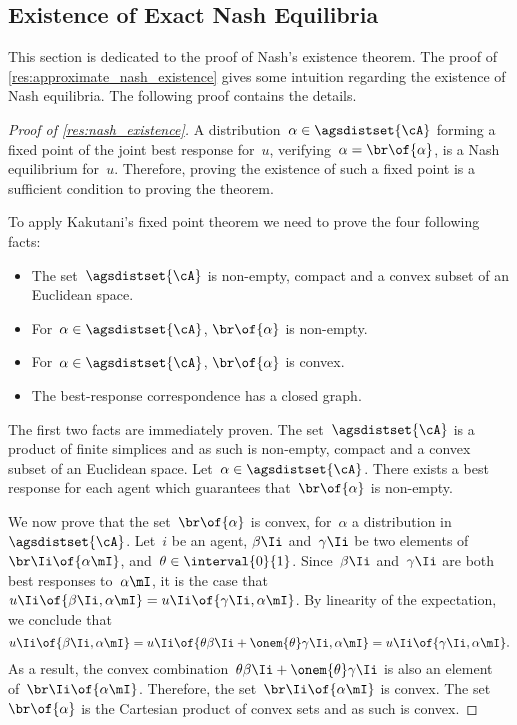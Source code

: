 \subsection{Existence of Exact Nash Equilibria}

This section is dedicated to the proof of Nash's existence theorem.
The proof of \cref{res:approximate_nash_existence} gives some intuition regarding the existence of Nash equilibria.
The following proof contains the details.

\begin{proof}[Proof of \cref{res:nash_existence}]
A distribution~\(\alpha \in \agsdistset{\cA}\) forming a fixed point of the joint best response for~\(u\), \ie verifying~\(\alpha = \br \of{\alpha}\), is a Nash equilibrium for~\(u\).
Therefore, proving the existence of such a fixed point is a sufficient condition to proving the theorem.

To apply Kakutani's fixed point theorem we need to prove the four following facts:
\begin{itemize}
\item The set~\(\agsdistset{\cA}\) is non-empty, compact and a convex subset of an Euclidean space.
\item For~\(\alpha \in \agsdistset{\cA}\), \(\br \of {\alpha}\) is non-empty.
\item For~\(\alpha \in \agsdistset{\cA}\), \(\br \of {\alpha}\) is convex.
\item The best-response correspondence has a closed graph.
\end{itemize}

The first two facts are immediately proven.
The set~\(\agsdistset{\cA}\) is a product of finite simplices and as such is non-empty, compact and a convex subset of an Euclidean space.
Let~\(\alpha \in \agsdistset{\cA}\).
There exists a best response for each agent which guarantees that~\(\br \of {\alpha}\) is non-empty.

We now prove that the set~\(\br \of {\alpha}\) is convex, for~\(\alpha\) a distribution in \(\agsdistset{\cA}\).
Let~\(i\) be an agent, \(\beta\Ii\) and~\(\gamma\Ii\) be two elements of~\(\br\Ii \of {\alpha\mI}\),  and~\(\theta \in \interval{0}{1}\).
Since~\(\beta\Ii\) and~\(\gamma\Ii\) are both best responses to~\(\alpha\mI\), it is the case that~\(u\Ii \of {\beta\Ii, \alpha\mI} = u\Ii \of {\gamma\Ii, \alpha\mI}\).
By linearity of the expectation, we conclude that
\[
u\Ii \of {\beta\Ii, \alpha\mI}
=
u\Ii \of {\theta \beta\Ii + \onem{\theta} \gamma\Ii, \alpha\mI}
=
u\Ii \of {\gamma\Ii, \alpha\mI}.
\]
As a result, the convex combination~\(\theta \beta\Ii + \onem{\theta} \gamma\Ii\) is also an element of~\(\br\Ii \of {\alpha\mI}\).
Therefore, the set~\(\br\Ii \of {\alpha\mI}\) is convex.
The set~\(\br \of {\alpha}\) is the Cartesian product of convex sets and as such is convex.


\end{proof}
